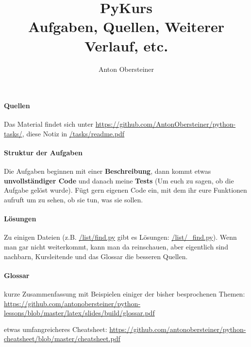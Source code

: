 \documentclass{article}
\title{PyKurs \\ \normalsize Aufgaben, Quellen, Weiterer Verlauf, etc.}
\author{Anton Obersteiner}
\begin{document}
\maketitle
\paragraph{Quellen}
	Das Material findet sich unter \url{https://github.com/AntonObersteiner/python-tasks/}, diese Notiz in \url{/tasks/readme.pdf}

\paragraph{Struktur der Aufgaben}
	Die Aufgaben beginnen mit einer \textbf{Beschreibung}, dann kommt etwas \textbf{unvollständiger Code} und danach meine \textbf{Tests} (Um euch zu sagen, ob die Aufgabe gelöst wurde). Fügt gern eigenen Code ein, mit dem ihr eure Funktionen aufruft um zu sehen, ob sie tun, was sie sollen.
\paragraph{Lösungen}
	Zu einigen Dateien (z.B. \url{/list/find.py} gibt es Lösungen: \url{/list/_find.py}). Wenn man gar nicht weiterkommt, kann man da reinschauen, aber eigentlich sind nachbarn, Kursleitende und das Glossar die besseren Quellen.

\paragraph{Glossar}
	kurze Zusammenfassung mit Beispielen einiger der bisher besprochenen Themen: \url{https://github.com/antonobersteiner/python-lessons/blob/master/latex/slides/build/glossar.pdf}

	etwas umfangreicheres Cheatsheet: \url{https://github.com/antonobersteiner/python-cheatsheet/blob/master/cheatsheet.pdf}
\end{document}
